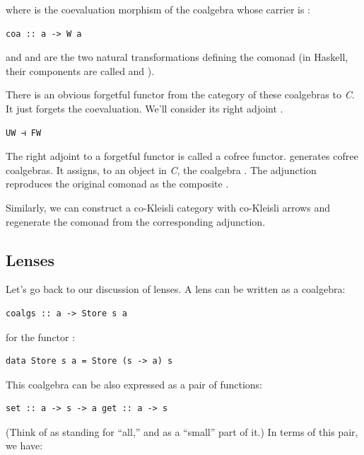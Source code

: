 where  is the coevaluation morphism of the coalgebra whose
carrier is :

\begin{verbatim}
coa :: a -> W a
\end{verbatim}

and  and  are the two natural transformations
defining the comonad (in Haskell, their components are called
 and ).

There is an obvious forgetful functor  from the category of
these coalgebras to \emph{C}. It just forgets the coevaluation. We'll
consider its right adjoint .

\begin{verbatim}
UW ⊣ FW
\end{verbatim}

The right adjoint to a forgetful functor is called a cofree functor.
 generates cofree coalgebras. It assigns, to an object
 in \emph{C}, the coalgebra . The
adjunction reproduces the original comonad as the composite
.

Similarly, we can construct a co-Kleisli category with co-Kleisli arrows
and regenerate the comonad from the corresponding adjunction.

\subsection{Lenses}\label{lenses}

Let's go back to our discussion of lenses. A lens can be written as a
coalgebra:

\begin{verbatim}
coalgs :: a -> Store s a
\end{verbatim}

for the functor :

\begin{verbatim}
data Store s a = Store (s -> a) s
\end{verbatim}

This coalgebra can be also expressed as a pair of functions:

\begin{verbatim}
set :: a -> s -> a get :: a -> s
\end{verbatim}

(Think of  as standing for ``all,'' and  as a
``small'' part of it.) In terms of this pair, we have:

